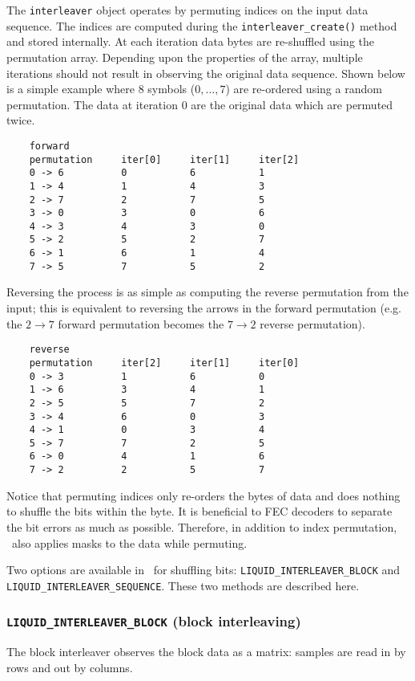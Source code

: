 The {\tt interleaver} object operates by permuting indices on the input data
sequence.
The indices are computed during the {\tt interleaver\_create()} method and
stored internally.
At each iteration data bytes are re-shuffled using the permutation array.
Depending upon the properties of the array, multiple iterations should not
result in observing the original data sequence.
Shown below is a simple example where 8 symbols ($0,\ldots,7$) are re-ordered
using a random permutation.
The data at iteration 0 are the original data which are permuted twice.
\begin{verbatim}
    forward
    permutation     iter[0]     iter[1]     iter[2]
    0 -> 6          0           6           1
    1 -> 4          1           4           3
    2 -> 7          2           7           5
    3 -> 0          3           0           6
    4 -> 3          4           3           0
    5 -> 2          5           2           7
    6 -> 1          6           1           4
    7 -> 5          7           5           2
\end{verbatim}
%
Reversing the process is as simple as computing the reverse permutation from
the input; this is equivalent to reversing the arrows in the forward
permutation
(e.g. the $2 \rightarrow 7$ forward permutation becomes the $7 \rightarrow 2$
reverse permutation).
\begin{verbatim}
    reverse
    permutation     iter[2]     iter[1]     iter[0]
    0 -> 3          1           6           0
    1 -> 6          3           4           1
    2 -> 5          5           7           2
    3 -> 4          6           0           3
    4 -> 1          0           3           4
    5 -> 7          7           2           5
    6 -> 0          4           1           6
    7 -> 2          2           5           7
\end{verbatim}
%
Notice that permuting indices only re-orders the bytes of data and does
nothing to shuffle the bits within the byte.
It is beneficial to FEC decoders to separate the bit errors as much as
possible.
Therefore, in addition to index permutation, \liquid\ also applies masks to
the data while permuting.

Two options are available in \liquid\ for shuffling bits:
{\tt LIQUID\_INTERLEAVER\_BLOCK} and {\tt LIQUID\_INTERLEAVER\_SEQUENCE}.
These two methods are described here.

\subsubsection{{\tt LIQUID\_INTERLEAVER\_BLOCK} (block interleaving)}
\label{module:framing:interleaver:block}
The block interleaver observes the block data as a matrix:
samples are read in by rows and out by columns.

